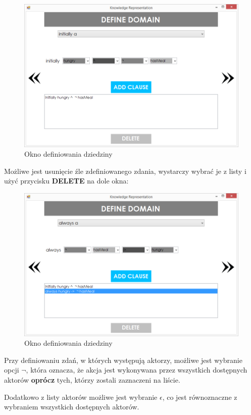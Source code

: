 \documentclass{article}
\begin{document}
\begin{figure}[H]
\centering
\includegraphics[scale=0.4]{08}
\caption{Okno definiowania dziedziny}
\end{figure}


Możliwe jest usunięcie źle zdefiniowanego zdania, wystarczy wybrać je z listy i użyć przycisku \textbf{DELETE} na dole okna:

\begin{figure}[H]
\centering
\includegraphics[scale=0.4]{09}
\caption{Okno definiowania dziedziny}
\end{figure}

\newpage
Przy definiowaniu zdań, w których występują aktorzy, możliwe jest wybranie opcji {\large{$\neg$}}, która oznacza, że akcja jest wykonywana przez wszystkich dostępnych aktorów \textbf{oprócz} tych, którzy zostali zaznaczeni na liście. 

Dodatkowo z listy aktorów możliwe jest wybranie $\epsilon$, co jest równoznaczne z wybraniem wszystkich dostępnych aktorów. 
\end{document}
